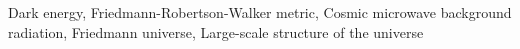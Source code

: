 \documentclass[twocolumn]{aastex631}
\begin{document}
Dark energy, Friedmann-Robertson-Walker metric, Cosmic microwave background radiation, Friedmann universe, Large-scale structure of the universe
\end{document}
